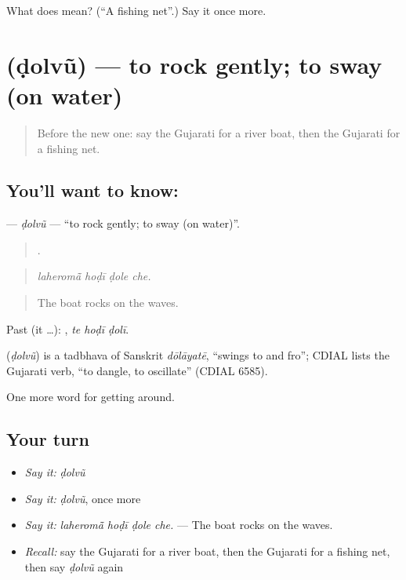 \begin{tcolorbox}[breakable,colback=teal!4,colframe=teal!35!black,title={Before you move on}]
What does  mean? (\textquotedblleft{}A fishing net\textquotedblright{}.) Say it once more.
\end{tcolorbox}
\section[\texorpdfstring{\gu{ડોલવું} (ḍolvũ)}{ડોલવું (ḍolvũ)}]{ (ḍolvũ) — to rock gently; to sway (on water)}

\label{lesson:GU-C442-dolvu}



\begin{quote}
Before the new one: say the Gujarati for a river boat, then the Gujarati for a fishing net.
\end{quote}

\subsection*{You'll want to know: }
\textbf{} — \emph{ḍolvũ} — \textquotedblleft{}to rock gently; to sway (on water)\textquotedblright{}.

\begin{quote}
   .
\end{quote}

\begin{quote}
\emph{laheromā̃ hoḍī ḍole che.}
\end{quote}

\begin{quote}
The boat rocks on the waves.
\end{quote}

Past (it …):   , \emph{te hoḍī ḍolī}.

\begin{cousinweb}
\textbf{} (\emph{ḍolvũ}) is a tadbhava of Sanskrit \emph{dōlāyatē}, \textquotedblleft{}swings to and fro\textquotedblright{}; CDIAL lists the Gujarati verb, \textquotedblleft{}to dangle, to oscillate\textquotedblright{} (CDIAL 6585).
\end{cousinweb}

\begin{grammarlens}[title={What you've built}]
One more word for getting around.
\end{grammarlens}

\subsection*{Your turn}
\begin{itemize}
\raggedright
  \item \emph{Say it:} \emph{ḍolvũ}
  \item \emph{Say it:} \emph{ḍolvũ}, once more
  \item \emph{Say it:} \emph{laheromā̃ hoḍī ḍole che.} — The boat rocks on the waves.
  \item \emph{Recall:} say the Gujarati for a river boat, then the Gujarati for a fishing net, then say \emph{ḍolvũ} again
\end{itemize}

